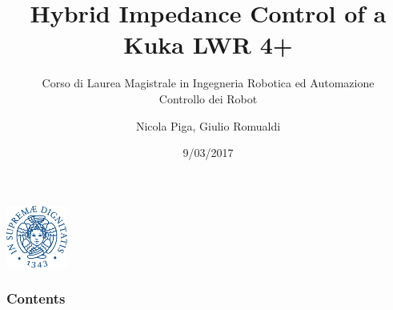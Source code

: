 \documentclass{beamer}
\date{9/03/2017}
\title[Hybrid Impedance Control]{Hybrid Impedance Control of a Kuka LWR 4+}
\subtitle{Corso di Laurea Magistrale in Ingegneria Robotica ed Automazione \\
  Controllo dei Robot}
\author{Nicola Piga, Giulio Romualdi}
\institute[]{Università di Pisa}
\begin{document}
\beamertemplatenavigationsymbolsempty

\begin{frame}
  \maketitle
  \centering
  \includegraphics[width=20mm]{cherubino}
\end{frame}

\begin{frame}
  \frametitle{Contents}
  \tableofcontents
\end{frame}
\end{document}
